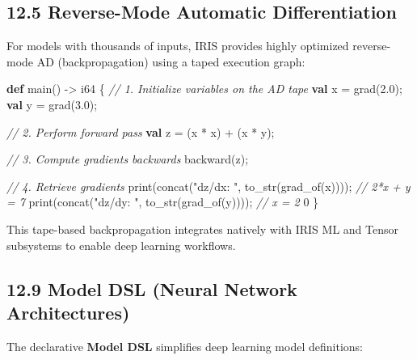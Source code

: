 \documentclass[
  english,
]{book}
\newenvironment{Shaded}{\begin{snugshade}}{\end{snugshade}}
\newcommand{\CommentTok}[1]{\textcolor[rgb]{0.42,0.60,0.33}{\textit{#1}}}
\newcommand{\DataTypeTok}[1]{\textcolor[rgb]{0.31,0.79,0.69}{#1}}
\newcommand{\DecValTok}[1]{\textcolor[rgb]{0.71,0.81,0.66}{#1}}
\newcommand{\FloatTok}[1]{\textcolor[rgb]{0.71,0.81,0.66}{#1}}
\newcommand{\FunctionTok}[1]{\textcolor[rgb]{0.86,0.86,0.67}{#1}}
\newcommand{\KeywordTok}[1]{\textcolor[rgb]{0.34,0.61,0.84}{\textbf{#1}}}
\newcommand{\NormalTok}[1]{\textcolor[rgb]{0.83,0.83,0.83}{#1}}
\newcommand{\OperatorTok}[1]{\textcolor[rgb]{0.83,0.83,0.83}{#1}}
\newcommand{\StringTok}[1]{\textcolor[rgb]{0.81,0.57,0.47}{#1}}
\begin{document}
\subsection{12.5 Reverse-Mode Automatic
Differentiation}\label{reverse-mode-automatic-differentiation-1}

For models with thousands of inputs, IRIS provides highly optimized
reverse-mode AD (backpropagation) using a taped execution graph:

\begin{Shaded}
\begin{Highlighting}[]
\KeywordTok{def}\NormalTok{ main() }\OperatorTok{{-}\textgreater{}} \DataTypeTok{i64}\NormalTok{ \{}
    \CommentTok{// 1. Initialize variables on the AD tape}
    \KeywordTok{val}\NormalTok{ x }\OperatorTok{=} \DataTypeTok{grad}\NormalTok{(}\FloatTok{2.0}\NormalTok{);}
    \KeywordTok{val}\NormalTok{ y }\OperatorTok{=} \DataTypeTok{grad}\NormalTok{(}\FloatTok{3.0}\NormalTok{);}
    
    \CommentTok{// 2. Perform forward pass}
    \KeywordTok{val}\NormalTok{ z }\OperatorTok{=}\NormalTok{ (x }\OperatorTok{*}\NormalTok{ x) }\OperatorTok{+}\NormalTok{ (x }\OperatorTok{*}\NormalTok{ y);}
    
    \CommentTok{// 3. Compute gradients backwards}
\NormalTok{    backward(z);}
    
    \CommentTok{// 4. Retrieve gradients}
    \FunctionTok{print}\NormalTok{(}\FunctionTok{concat}\NormalTok{(}\StringTok{"dz/dx: "}\NormalTok{, }\FunctionTok{to\_str}\NormalTok{(grad\_of(x)))); }\CommentTok{// 2*x + y = 7}
    \FunctionTok{print}\NormalTok{(}\FunctionTok{concat}\NormalTok{(}\StringTok{"dz/dy: "}\NormalTok{, }\FunctionTok{to\_str}\NormalTok{(grad\_of(y)))); }\CommentTok{// x = 2}
    \DecValTok{0}
\NormalTok{\}}
\end{Highlighting}
\end{Shaded}

This tape-based backpropagation integrates natively with IRIS ML and
Tensor subsystems to enable deep learning workflows.

\subsection{12.9 Model DSL (Neural Network
Architectures)}\label{model-dsl-neural-network-architectures}

The declarative \textbf{Model DSL} simplifies deep learning model
definitions:
\end{document}
